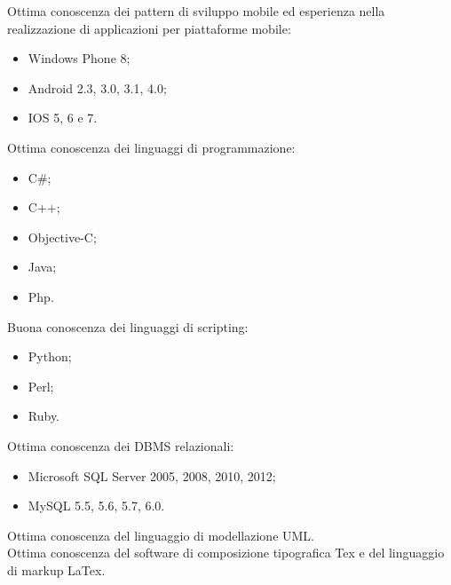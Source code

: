 \documentclass[totpages,helvetica,openbib,italian]{europecv}
\begin{document}
\begin{europecv}
{\begin{minipage}[t]{1\linewidth}
Ottima conoscenza dei pattern di sviluppo mobile ed esperienza nella realizzazione di applicazioni per piattaforme mobile:
\begin{itemize}
\vspace{-3mm}\item[]Windows Phone 8;
\vspace{-3mm}\item[]Android 2.3, 3.0, 3.1, 4.0;
\vspace{-3mm}\item[]IOS 5, 6 e 7.
\end{itemize}

Ottima conoscenza dei linguaggi di programmazione:
\begin{itemize}
\vspace{-3mm}\item[]C\#;
\vspace{-3mm}\item[]C++;
\vspace{-3mm}\item[]Objective-C;
\vspace{-3mm}\item[]Java;
\vspace{-3mm}\item[]Php.
\end{itemize}

Buona conoscenza dei linguaggi di scripting:
\begin{itemize}
\vspace{-3mm}\item[]Python;
\vspace{-3mm}\item[]Perl;
\vspace{-3mm}\item[]Ruby.
\end{itemize}

Ottima conoscenza dei DBMS relazionali:
\begin{itemize}
\vspace{-3mm}\item[]Microsoft SQL Server 2005, 2008, 2010, 2012;
\vspace{-3mm}\item[]MySQL 5.5, 5.6, 5.7, 6.0.
\end{itemize}

Ottima conoscenza del linguaggio di modellazione UML.\\\newline
Ottima conoscenza del software di composizione tipografica Tex e del linguaggio di markup LaTex.


\end{minipage}}
\end{europecv}
\end{document}
